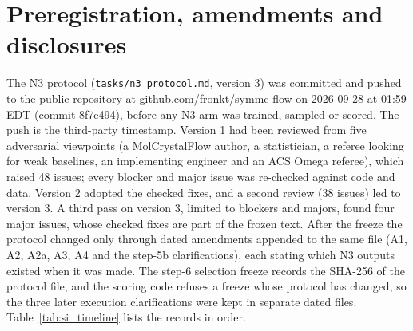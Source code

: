 \section{Preregistration, amendments and disclosures}\label{si:prereg}

The N3 protocol (\texttt{tasks/n3\_protocol.md}, version 3) was committed and
pushed to the public repository at github.com/fronkt/symmc-flow on 2026-09-28 at
01:59 EDT (commit 8f7e494), before any N3 arm was trained, sampled or scored.
The push is the third-party timestamp. Version 1 had been reviewed from five
adversarial viewpoints (a MolCrystalFlow author, a statistician, a referee looking
for weak baselines, an implementing engineer and an ACS Omega referee), which
raised 48 issues; every blocker and major issue was re-checked against code and
data. Version 2 adopted the checked fixes, and a second review (38 issues) led to
version 3. A third pass on version 3, limited to blockers and majors, found four
major issues, whose checked fixes are part of the frozen text. After the freeze the
protocol changed only through dated amendments appended to the same file (A1, A2,
A2a, A3, A4 and the step-5b clarifications), each stating which N3 outputs existed
when it was made. The step-6 selection freeze records the SHA-256 of the protocol
file, and the scoring code refuses a freeze whose protocol has changed, so the
three later execution clarifications were kept in separate dated files.
Table~\ref{tab:si_timeline} lists the records in order.

